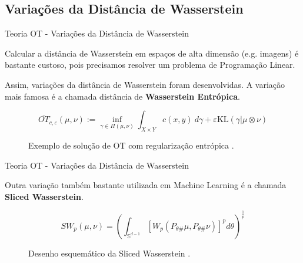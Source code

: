 \documentclass[10pt]{beamer}
\begin{document}
\subsection{Variações da Distância de Wasserstein}
\begin{frame}[fragile]{Teoria OT - Variações da Distância de Wasserstein}

	Calcular a distância de Wasserstein em espaços de alta dimensão (e.g. imagens)
	é bastante custoso, pois precisamos resolver um problema de Programação Linear.

	\vspace{3mm}
	Assim, variações da distância
	de Wasserstein foram desenvolvidas. A variação mais famosa é a chamada
	distância de \textbf{Wasserstein Entrópica}.

	\begin{displaymath}
		\overline{OT}_{c,\varepsilon}(\mu,\nu):=
		\inf_{\gamma \in \Pi(\mu,\nu)} \int_{X \times Y} c(x,y) \ d\gamma + \varepsilon \text{KL}(\gamma | \mu \otimes \nu)
	\end{displaymath}

	\begin{figure}[H]
		\centering
		\def\svgscale{0.4}
		
		\caption{
			Exemplo de solução de OT com regularização entrópica
			\citep{sales2021optimal}.}
		\label{fig:entropicot}
	\end{figure}

\end{frame}

\begin{frame}[fragile]{Teoria OT - Variações da Distância de Wasserstein}

	Outra variação também bastante utilizada em Machine Learning
	é a chamada \textbf{Sliced Wasserstein}.

	\begin{displaymath}
		SW_p(\mu,\nu) =
		\left(
		\int_{\mathbb S^{d-1}} [W_p(P_{\theta \#}\mu,P_{\theta \#} \nu)]^p d\theta
		\right)^\frac{1}{p}
	\end{displaymath}

	\begin{figure}[H]
		\centering
		\def\svgscale{0.12}
		
		\caption{
			Desenho esquemático da Sliced Wasserstein
			\citep{sales2021optimal}.}
		\label{fig:pub}
	\end{figure}

\end{frame}
\end{document}
